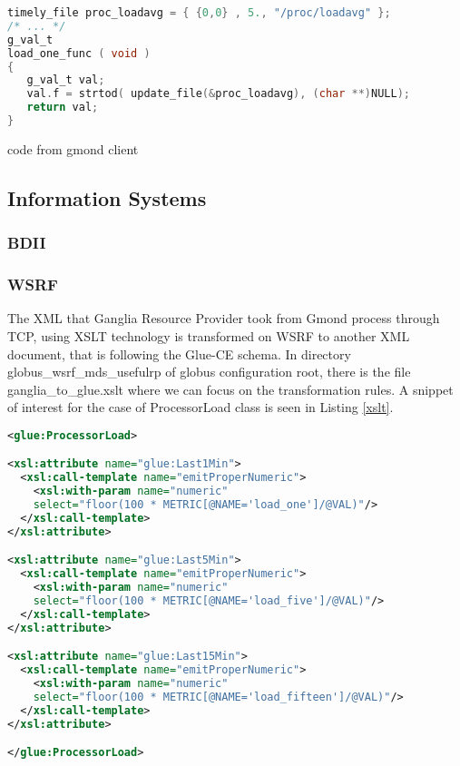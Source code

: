 \begin{lstlisting}[language=C,caption=libmetrics code to get load average]
timely_file proc_loadavg = { {0,0} , 5., "/proc/loadavg" };
/* ... */
g_val_t
load_one_func ( void )
{
   g_val_t val;
   val.f = strtod( update_file(&proc_loadavg), (char **)NULL);
   return val;
}
\end{lstlisting}
code from gmond client

\subsection{Information Systems}

\subsubsection{BDII}

\subsubsection{WSRF}

The XML that Ganglia Resource Provider took from Gmond process through TCP, using XSLT technology is transformed on WSRF to another XML document, that is following the Glue-CE schema. In directory globus\_wsrf\_mds\_usefulrp of globus configuration root, there is the file ganglia\_to\_glue.xslt where we can focus on the transformation rules. A snippet of interest for the case of ProcessorLoad class is seen in Listing \ref{xslt}.

\begin{lstlisting}[language=XML,caption=WSRF XSLT for Ganglia Information Provider,label=xslt]
<glue:ProcessorLoad>

<xsl:attribute name="glue:Last1Min">
  <xsl:call-template name="emitProperNumeric">
    <xsl:with-param name="numeric" 
    select="floor(100 * METRIC[@NAME='load_one']/@VAL)"/>
  </xsl:call-template>
</xsl:attribute>

<xsl:attribute name="glue:Last5Min">
  <xsl:call-template name="emitProperNumeric">
    <xsl:with-param name="numeric" 
    select="floor(100 * METRIC[@NAME='load_five']/@VAL)"/>
  </xsl:call-template>
</xsl:attribute>

<xsl:attribute name="glue:Last15Min">
  <xsl:call-template name="emitProperNumeric">
    <xsl:with-param name="numeric" 
    select="floor(100 * METRIC[@NAME='load_fifteen']/@VAL)"/>
  </xsl:call-template>
</xsl:attribute>

</glue:ProcessorLoad>
\end{lstlisting}


